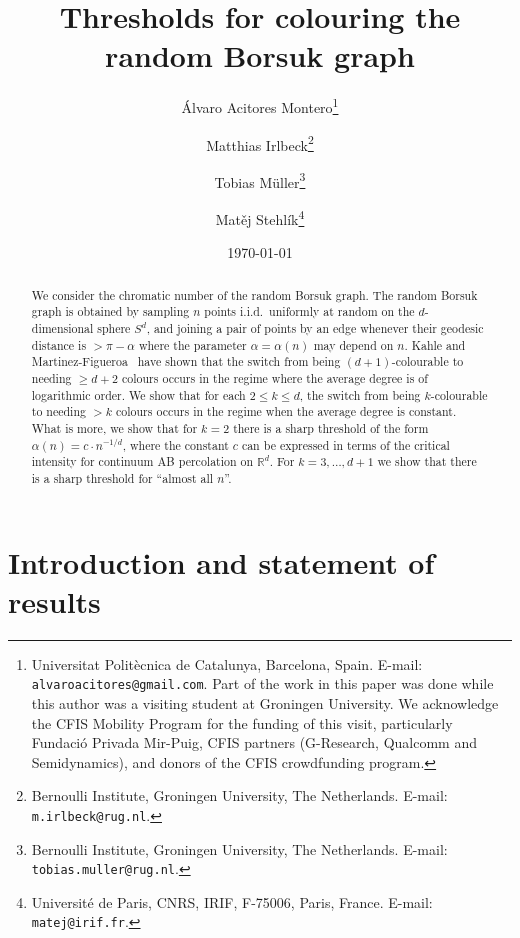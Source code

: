 \documentclass[11pt]{article}%
\newcommand{\eR}[0]{\ensuremath{ \mathbb R}}
\begin{document}
\title{Thresholds for colouring the random Borsuk graph}


\author{%
\'Alvaro Acitores Montero\thanks{Universitat Polit\`ecnica de Catalunya, Barcelona, Spain. E-mail: 
{\tt alvaroacitores@gmail.com}. 
Part of the work in this paper was done while this author was a visiting student at Groningen University. 
We acknowledge the CFIS Mobility Program for the funding of this visit, particularly 
Fundaci\'o Privada Mir-Puig, CFIS partners (G-Research, Qualcomm and Semidynamics), and donors of the CFIS 
crowdfunding program.} 
\and
Matthias Irlbeck\thanks{Bernoulli Institute, Groningen University, The Netherlands. E-mail: {\tt m.irlbeck@rug.nl}.} 
\and
Tobias M\"uller\thanks{Bernoulli Institute, Groningen University, The Netherlands. E-mail: {\tt tobias.muller@rug.nl}.}
\and 
Mat\v ej Stehl\'ik\thanks{Universit\'e de Paris, CNRS, IRIF, F-75006, Paris, France. E-mail: {\tt matej@irif.fr}.}
}

\date{\today}

\maketitle

\begin{abstract} 
We consider the chromatic number of the random Borsuk graph.
The random Borsuk graph is obtained by sampling $n$ points i.i.d.~uniformly at random on the $d$-dimensional
sphere $S^d$, and joining a pair of points by an edge whenever their geodesic distance is $>\pi-\alpha$ where 
the parameter $\alpha=\alpha(n)$ may depend on $n$.
Kahle and Martinez-Figueroa~\cite{KahleFig} have shown that the switch from being $(d+1)$-colourable to needing $\geq d+2$ colours 
occurs in the regime where the average degree is of logarithmic order.
We show that for each $2\leq k\leq d$, the switch from being $k$-colourable to needing $> k$ colours
occurs in the regime when the average degree is constant.
What is more, we show that for $k=2$ there is a sharp threshold of the form $\alpha(n) = c \cdot n^{-1/d}$, where 
the constant $c$ can be expressed in terms of the critical intensity for continuum AB percolation on $\eR^d$.
For $k=3,\dots,d+1$ we show that there is a sharp threshold for ``almost all $n$''.
\end{abstract}




\section{Introduction and statement of results}
\end{document}

